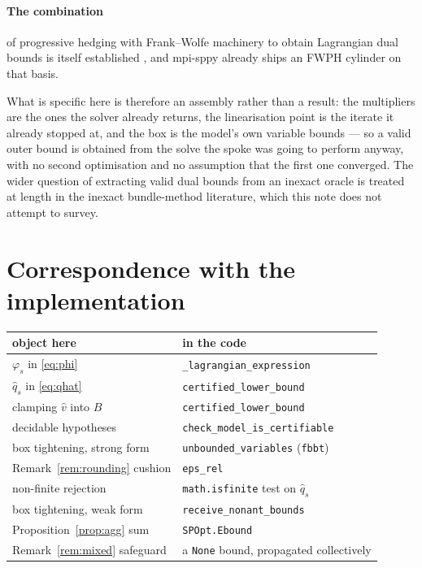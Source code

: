 \documentclass[11pt]{article}
\theoremstyle{plain}
\theoremstyle{remark}
\newcommand{\vhat}{\hat{v}}
\newcommand{\qhat}{\hat{q}}
\begin{document}
\paragraph{The combination} of progressive hedging with Frank--Wolfe machinery to
obtain Lagrangian dual bounds is itself established \cite{boland2018}, and
mpi-sppy already ships an FWPH cylinder on that basis.

What is specific here is therefore an assembly rather than a result: the
multipliers are the ones the solver already returns, the linearisation point is the
iterate it already stopped at, and the box is the model's own variable bounds ---
so a valid outer bound is obtained from the solve the spoke was going to perform
anyway, with no second optimisation and no assumption that the first one
converged.  The wider question of extracting valid dual bounds from an inexact
oracle is treated at length in the inexact bundle-method literature, which this
note does not attempt to survey.

\section{Correspondence with the implementation}

\begin{center}
\begin{tabular}{ll}
\toprule
object here & in the code \\
\midrule
$\varphi_s$ in \eqref{eq:phi}      & \texttt{\_lagrangian\_expression} \\
$\qhat_s$ in \eqref{eq:qhat}       & \texttt{certified\_lower\_bound} \\
clamping $\vhat$ into $B$          & \texttt{certified\_lower\_bound} \\
decidable hypotheses               & \texttt{check\_model\_is\_certifiable} \\
box tightening, strong form        & \texttt{unbounded\_variables} (\texttt{fbbt}) \\
Remark~\ref{rem:rounding} cushion  & \texttt{eps\_rel} \\
non-finite rejection               & \texttt{math.isfinite} test on $\qhat_s$ \\
\midrule
box tightening, weak form          & \texttt{receive\_nonant\_bounds} \\
Proposition~\ref{prop:agg} sum     & \texttt{SPOpt.Ebound} \\
Remark~\ref{rem:mixed} safeguard   & a \texttt{None} bound, propagated collectively \\
\bottomrule
\end{tabular}
\end{center}
\end{document}
